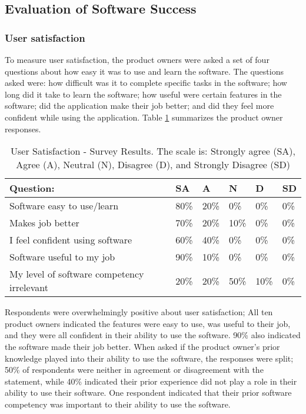 \subsection{Evaluation of Software Success}
\subsubsection{User satisfaction}

To measure user satisfaction, the product owners were asked a set of four questions about how easy it was to use and learn the software. The questions asked were: how difficult was it to complete specific tasks in the software; how long did it take to learn the software; how useful were certain features in the software; did the application make their job better; and did they feel more confident while using the application. Table \ref{table:usersatisfaction} summarizes the product owner responses.

\begin{table}
\caption{User Satisfaction - Survey Results. The scale is: Strongly agree (SA), Agree (A), Neutral (N), Disagree (D), and Strongly Disagree (SD)}
\label{table:usersatisfaction}
\begin{tabular}{p{4.3cm}p{.4cm}p{.4cm}p{.38cm}p{.4cm}p{.4cm}}
Question: & SA & A & N & D & SD \\
 \hline
Software easy to use/learn & 80\% & 20\% & 0\% & 0\% & 0\% \\
Makes job better & 70\% & 20\% & 10\% & 0\% & 0\% \\
I feel confident using software & 60\% & 40\% & 0\% & 0\% & 0\% \\
Software useful to my job & 90\% & 10\% & 0\% & 0\% & 0\% \\
My level of software competency irrelevant & 20\% & 20\% & 50\% & 10\% & 0\% \\
\end{tabular}
\end{table}


Respondents were overwhelmingly positive about user satisfaction; All ten product owners indicated the features were easy to use, was useful to their job, and they were all confident in their ability to use the software. 90\% also indicated the software made their job better. When asked if the product owner's prior knowledge played into their ability to use the software, the responses were split; 50\% of respondents were neither in agreement or disagreement with the statement, while 40\% indicated their prior experience did not play a role in their ability to use their software. One respondent indicated that their prior software competency was important to their ability to use the software.

